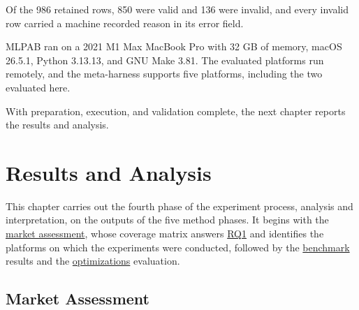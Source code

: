 \documentclass[
english,                 %
bibtex,                  %
]{kththesis}
\newcommand*{\retainedRunCount}{986}
\numberwithin{listing}{chapter}
\begin{document}
Of the \retainedRunCount{} retained rows, 850 were valid and 136 were invalid, and every invalid row carried a machine recorded reason in its error field.

\gls{MLPAB} ran on a 2021 M1 Max MacBook Pro with 32 \gls{GB} of memory, mac\Gls{OS} 26.5.1, Python 3.13.13, and GNU Make 3.81. The evaluated platforms run remotely, and the meta-harness supports five platforms, including the two evaluated here.

With preparation, execution, and validation complete, the next chapter reports the results and analysis.

\cleardoublepage

\chapter{Results and Analysis}
\label{ch:results_and_analysis}

This chapter carries out the fourth phase of the experiment process, analysis and interpretation, on the outputs of the five method phases. It begins with the \hyperref[sec:results_market_assessment]{market assessment}, whose coverage matrix answers \hyperref[rq1]{RQ1} and identifies the platforms on which the experiments were conducted, followed by the \hyperref[sec:results_benchmark]{benchmark} results and the \hyperref[sec:results_optimizations]{optimizations} evaluation.

\section{Market Assessment}
\label{sec:results_market_assessment}
\glsresetall
\end{document}
